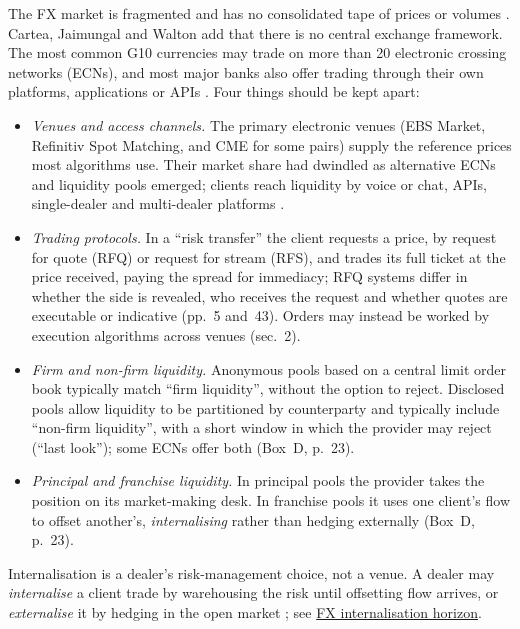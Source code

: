 \begin{qfdefinition}\label{def:fx-market-structure}
 The FX market is fragmented and has no consolidated tape of prices or volumes \citep[sec.~2.2, p.~22]{exp-fx-algos}. Cartea, Jaimungal and Walton add that there is no central exchange framework. The most common G10 currencies may trade on more than 20 electronic crossing networks (ECNs), and most major banks also offer trading through their own platforms, applications or APIs \citep[arXiv version, sec.~1, p.~2]{dm-cartea-jaimungal-walton-2019}. Four things should be kept apart:
\begin{itemize}
\item \emph{Venues and access channels.} The primary electronic venues (EBS Market, Refinitiv Spot Matching, and CME for some pairs) supply the reference prices most algorithms use. Their market share had dwindled as alternative ECNs and liquidity pools emerged; clients reach liquidity by voice or chat, APIs, single-dealer and multi-dealer platforms \citep[pp.~12, 22--23]{exp-fx-algos}.
\item \emph{Trading protocols.} In a ``risk transfer'' the client requests a price, by request for quote (RFQ) or request for stream (RFS), and trades its full ticket at the price received, paying the spread for immediacy; RFQ systems differ in whether the side is revealed, who receives the request and whether quotes are executable or indicative (pp.~5 and~43). Orders may instead be worked by execution algorithms across venues (sec.~2).
\item \emph{Firm and non-firm liquidity.} Anonymous pools based on a central limit order book typically match ``firm liquidity'', without the option to reject. Disclosed pools allow liquidity to be partitioned by counterparty and typically include ``non-firm liquidity'', with a short window in which the provider may reject (``last look''); some ECNs offer both (Box~D, p.~23).
\item \emph{Principal and franchise liquidity.} In principal pools the provider takes the position on its market-making desk. In franchise pools it uses one client's flow to offset another's, \emph{internalising} rather than hedging externally (Box~D, p.~23).
\end{itemize}
Internalisation is a dealer's risk-management choice, not a venue. A dealer may \emph{internalise} a client trade by warehousing the risk until offsetting flow arrives, or \emph{externalise} it by hedging in the open market \citep[accepted version, abstract and sec.~1, p.~1]{cfd-butz-oomen-2019}; see \hyperref[mod:fx-internalisation-horizon]{FX internalisation horizon}.


\end{qfdefinition}
